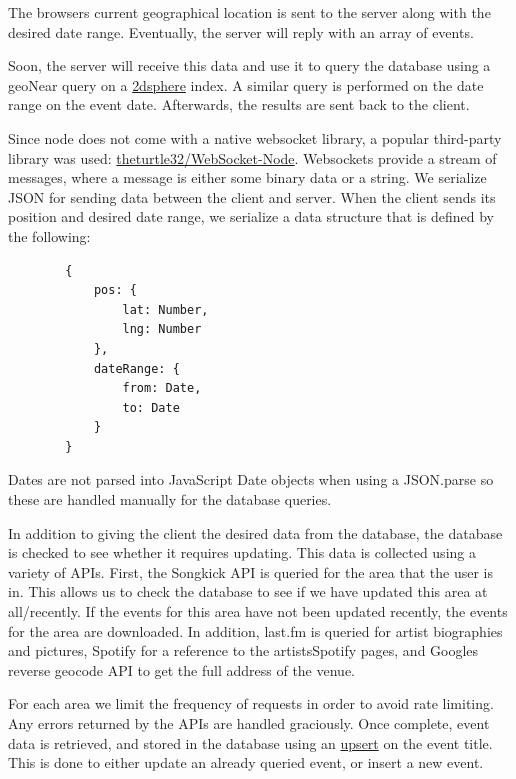 \documentclass[10pt]{article}
\begin{document}
        The browser\textquotesingle s current geographical location is sent to the server along with the desired date range. Eventually, the server will reply with an array of events.

        Soon, the server will receive this data and use it to query the database using a geoNear query on a \href{https://docs.mongodb.com/manual/core/2dsphere/}{2dsphere} index. A similar query is performed on the date range on the event date. Afterwards, the results are sent back to the client.

        Since node does not come with a native websocket library, a popular third-party library was used: \href{https://github.com/theturtle32/WebSocket-Node}{theturtle32/WebSocket-Node}. Websockets provide a stream of messages, where a message is either some binary data or a string. We serialize JSON for sending data between the client and server. When the client sends its position and desired date range, we serialize a data structure that is defined by the following:

        \begin{verbatim}
        {
            pos: {
                lat: Number,
                lng: Number
            },
            dateRange: {
                from: Date,
                to: Date
            }
        }
        \end{verbatim}

        Dates are not parsed into JavaScript Date objects when using a JSON.parse so these are handled manually for the database queries.

        In addition to giving the client the desired data from the database, the database is checked to see whether it requires updating. This data is collected using a variety of APIs. First, the Songkick API is queried for the area that the user is in. This allows us to check the database to see if we have updated this area at all/recently. If the events for this area have not been updated recently, the events for the area are downloaded. In addition, last.fm is queried for artist biographies and pictures, Spotify for a reference to the artists\textquotesingle  Spotify pages, and Google\textquotesingle s reverse geocode API to get the full address of the venue.

        For each area we limit the frequency of requests in order to avoid rate limiting. Any errors returned by the APIs are handled graciously. Once complete, event data is retrieved, and stored in the database using an \href{https://docs.mongodb.com/manual/reference/method/db.collection.update/#upsert-option}{upsert} on the event title. This is done to either update an already queried event, or insert a new event.
\end{document}
